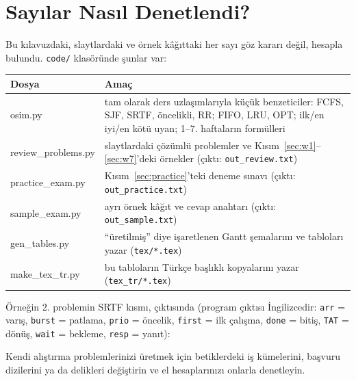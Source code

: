 \section{Sayılar Nasıl Denetlendi?}
\label{sec:check}
Bu kılavuzdaki, slaytlardaki ve örnek kâğıttaki her sayı göz kararı değil, hesapla bulundu. \texttt{code/} klasöründe şunlar var:
\begin{center}
\renewcommand{\arraystretch}{1.2}
\begin{tabularx}{\linewidth}{@{}>{\ttfamily}l X@{}}
\toprule
\textrm{\textbf{Dosya}} & \textbf{Amaç} \\
\midrule
osim.py & tam olarak ders uzlaşımlarıyla küçük benzeticiler: FCFS, SJF, SRTF, öncelikli, RR; FIFO, LRU, OPT; ilk/en iyi/en kötü uyan; 1--7. haftaların formülleri \\
review\_problems.py & slaytlardaki çözümlü problemler ve Kısım~\ref{sec:w1}--\ref{sec:w7}'deki örnekler (çıktı: \texttt{out\_review.txt}) \\
practice\_exam.py & Kısım~\ref{sec:practice}'teki deneme sınavı (çıktı: \texttt{out\_practice.txt}) \\
sample\_exam.py & ayrı örnek kâğıt ve cevap anahtarı (çıktı: \texttt{out\_sample.txt}) \\
gen\_tables.py & ``üretilmiş'' diye işaretlenen Gantt şemalarını ve tabloları yazar (\texttt{tex/*.tex}) \\
make\_tex\_tr.py & bu tabloların Türkçe başlıklı kopyalarını yazar (\texttt{tex\_tr/*.tex}) \\
\bottomrule
\end{tabularx}
\end{center}
Örneğin 2. problemin SRTF kısmı,  çıktısında (program çıktısı İngilizcedir: \texttt{arr} = varış, \texttt{burst} = patlama, \texttt{prio} = öncelik, \texttt{first} = ilk çalışma, \texttt{done} = bitiş, \texttt{TAT} = dönüş, \texttt{wait} = bekleme, \texttt{resp} = yanıt):

Kendi alıştırma problemlerinizi üretmek için betiklerdeki iş kümelerini, başvuru dizilerini ya da delikleri değiştirin ve el hesaplarınızı onlarla denetleyin.

